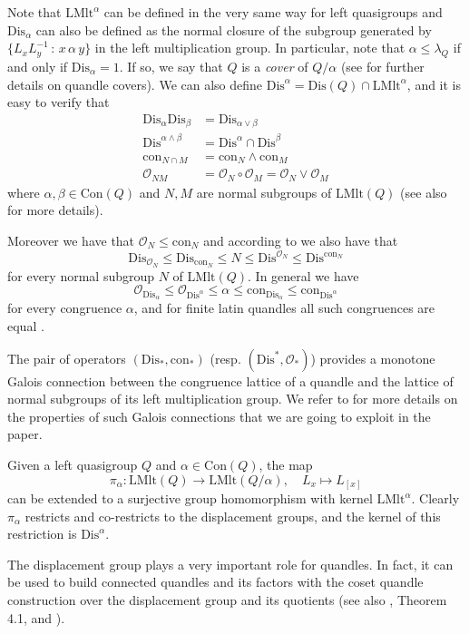 \documentclass[a4paper, english, 9pt]{amsart}
\theoremstyle{plain}
\theoremstyle{definition}
\def\lmlt{\mathrm{LMlt}}
\def\dis{\mathrm{Dis}}
\def\con{\mathrm{Con}}
\def\c#1{\mathrm{con}_{#1}}
\def\setof#1#2{\{#1\,\colon\,#2\}}
\begin{document}
Note that $\lmlt^\alpha$ can be defined in the very same way for left quasigroups and $\dis_\alpha$ can also be defined as the normal closure of the subgroup generated by $\setof{L_x L_y^{-1}}{x\, \alpha \, y}$ in the left multiplication group. In particular, note that $\alpha\leq \lambda_Q$ if and only if $\dis_\alpha=1$. If so, we say that $Q$ is a {\it cover} of $Q/\alpha$ (see \cite{Eisermann, covering_paper, Involutory} for further details on quandle covers). We can also define $\dis^\alpha=\dis(Q)\cap \lmlt^\alpha$, and it is easy to verify that 
\begin{align*}
    \dis_\alpha\dis_\beta&=\dis_{\alpha\vee \beta} \\
    \dis^{\alpha\wedge\beta}&=\dis^\alpha\cap \dis^\beta\\
    \c{N\cap M}&=\c{N}\wedge\c{M}\\
    \mathcal{O}_{NM}&=\mathcal{O}_N\circ \mathcal{O}_M=\mathcal{O}_N\vee\mathcal{O}_M
\end{align*}
where $\alpha,\beta\in \con(Q)$ and $N,M$ are normal subgroups of $\lmlt(Q)$ (see also \cite[Proposition 3.2]{CP} for more details).

Moreover we have that $\mathcal{O}_N\leq \c{N}$ and according to \cite[Proposition 3.5(1)]{CP} we also  have that $$\dis_{\mathcal{O}_N}\leq \dis_{\c{N}}\leq N\leq \dis^{\mathcal{O}_N}\leq \dis^{\c{N}}$$  for every normal subgroup $N$ of $\lmlt(Q)$. In general we have
$$\mathcal{O}_{\dis_\alpha}\leq \mathcal{O}_{\dis^\alpha}\leq \alpha\leq \c{\dis_\alpha}\leq \c{\dis^\alpha}$$
for every congruence $\alpha$, and for finite latin quandles all such congruences are equal \cite[Lemma 1.8]{Galois}.

The pair of operators $(\dis_*,\c{*})$ (resp. $(\dis^*,\mathcal{O}_*)$) provides a monotone Galois connection between the congruence lattice of a quandle and the lattice of normal subgroups of its left multiplication group. We refer to \cite{CP} for more details on the properties of such Galois connections that we are going to exploit in the paper.

Given a left quasigroup $Q$ and $\alpha\in \con(Q)$, the map
$$\pi_\alpha:\lmlt(Q)\longrightarrow \lmlt(Q/\alpha),\quad L_x\mapsto L_{[x]}$$
can be extended to a surjective group homomorphism with kernel $\lmlt^\alpha$. Clearly $\pi_\alpha$ restricts and co-restricts to the displacement groups, and the kernel of this restriction is $\dis^\alpha$.

The displacement group plays a very important role for quandles. In fact, it can be used to build connected quandles and its factors with the coset quandle construction over the displacement group and its quotients (see also \cite{hsv}, Theorem 4.1, and \cite{J}). 
\end{document}
